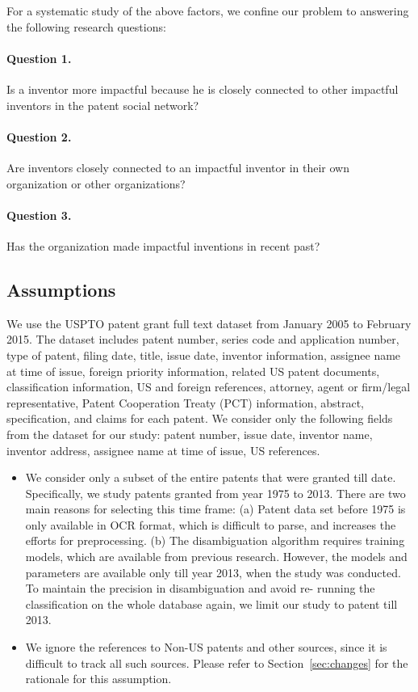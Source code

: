 For a systematic study of the above factors, we confine our problem to
answering the following research questions:

\paragraph{Question 1.} Is a inventor more impactful because he is closely
connected to other impactful inventors in the patent social network? 

\paragraph{Question  2.} Are inventors closely connected to an impactful
inventor in their own organization or other organizations? %

\paragraph{Question  3.} Has the organization made impactful inventions in
recent past? %


\subsection{Assumptions}
\label{sec:assumptions}
We use the USPTO patent grant full text dataset from January 2005 to February
2015.  The dataset includes patent number, series code and application number,
type of patent, filing date, title, issue date, inventor information, assignee
name at time of issue, foreign priority information, related US patent
documents, classification information, US and foreign references, attorney,
agent or firm/legal representative, Patent Cooperation Treaty (PCT)
information, abstract, specification, and claims for each patent. We consider
only the following fields from the dataset for our study: patent number, issue
date, inventor name, inventor address, assignee name at time of issue, US
references.

	\begin{itemize}
		
		\item We consider only a subset of the entire patents that were granted till
		date. Specifically, we study patents granted from year 1975 to 2013. There are
		two main reasons for selecting this time frame: (a) Patent data set before
		1975 is only available in OCR format, which is difficult to parse, and
		increases the efforts for preprocessing. (b) The disambiguation algorithm
		requires training models, which are available from previous research. However,
		the models and parameters are available only till year 2013, when the study
		was conducted. To maintain the precision in disambiguation and avoid re-
		running the classification on the whole database again, we limit our study to
		patent till 2013.

		\item We ignore the references to Non-US patents and other sources, since it
		is difficult to track all such sources. Please refer to
		Section~\ref{sec:changes} for the rationale for this assumption.
	\end{itemize}


